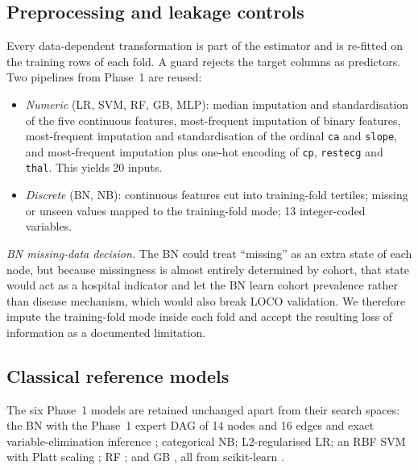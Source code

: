 \documentclass[conference]{IEEEtran}
\newcommand{\code}[1]{\texttt{\small #1}}
\begin{document}
\subsection{Preprocessing and leakage controls}\label{sec:prep}
Every data-dependent transformation is part of the estimator and is re-fitted on the training rows of each fold. A guard rejects the target columns as predictors. Two pipelines from Phase~1 are reused:
\begin{itemize}
\item \textit{Numeric} (LR, SVM, RF, GB, MLP): median imputation and standardisation of the five continuous features, most-frequent imputation of binary features, most-frequent imputation and standardisation of the ordinal \code{ca} and \code{slope}, and most-frequent imputation plus one-hot encoding of \code{cp}, \code{restecg} and \code{thal}. This yields 20 inputs.
\item \textit{Discrete} (BN, NB): continuous features cut into training-fold tertiles; missing or unseen values mapped to the training-fold mode; 13 integer-coded variables.
\end{itemize}
\textit{BN missing-data decision.} The BN could treat ``missing'' as an extra state of each node, but because missingness is almost entirely determined by cohort, that state would act as a hospital indicator and let the BN learn cohort prevalence rather than disease mechanism, which would also break LOCO validation. We therefore impute the training-fold mode inside each fold and accept the resulting loss of information as a documented limitation.

\subsection{Classical reference models}
The six Phase~1 models are retained unchanged apart from their search spaces: the BN with the Phase~1 expert DAG of 14 nodes and 16 edges and exact variable-elimination inference \cite{pearl,pgmpy}; categorical NB; L2-regularised LR; an RBF SVM \cite{cortes} with Platt scaling \cite{platt}; RF \cite{breiman_rf}; and GB \cite{friedman_gb}, all from scikit-learn \cite{sklearn}.
\end{document}
